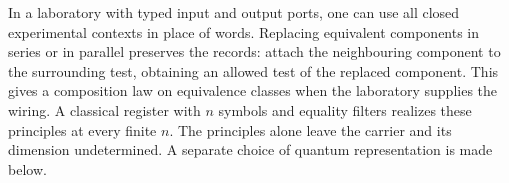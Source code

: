 In a laboratory with typed input and output ports, one can use all closed experimental contexts in place of words. Replacing equivalent components in series or in parallel preserves the records: attach the neighbouring component to the surrounding test, obtaining an allowed test of the replaced component. This gives a composition law on equivalence classes when the laboratory supplies the wiring. A classical register with $n$ symbols and equality filters realizes these principles at every finite $n$. The principles alone leave the carrier and its dimension undetermined. A separate choice of quantum representation is made below.
